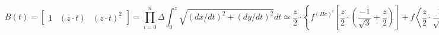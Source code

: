 \[
    B(t) =
    \begin{bmatrix}
      1 & (z \cdot t) & (z \cdot t)^2
    \end{bmatrix}
    =
    \prod_{i=0}^n
    \Delta
    \int_{0}^{z}\sqrt{ \left (dx/dt \right )^2+\left (dy/dt \right )^2} dt
    \simeq
    \frac{z}{2} \cdot
    \left \{
        f^{(\Pi e)^i}
        \left [
            \frac{z}{2} \cdot \left ( \frac{-1}{\sqrt{3}} + \frac{z}{2} \right )
        \right ]
        + f
        \left <
            \frac{z}{2} \cdot \frac{1}{\sqrt{3}} + \frac{z}{2}
        \right >
    \right \}
\]
